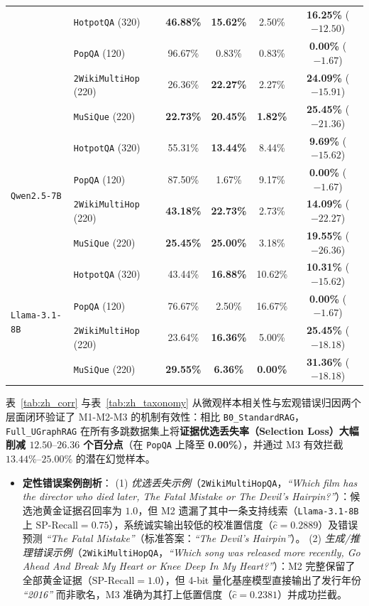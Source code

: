 \documentclass[11pt]{article}
\begin{document}
\begin{table}[t]
{\begin{tabular}{llcccc}
& \texttt{HotpotQA} (320) & \textbf{46.88\%} & \textbf{15.62\%} & 2.50\% & \textbf{16.25\%} ($-12.50$) \\
& \texttt{PopQA} (120) & 96.67\% & 0.83\% & 0.83\% & \textbf{0.00\%} ($-1.67$) \\
& \texttt{2WikiMultiHop} (220) & 26.36\% & \textbf{22.27\%} & 2.27\% & \textbf{24.09\%} ($-15.91$) \\
& \texttt{MuSiQue} (220) & \textbf{22.73\%} & \textbf{20.45\%} & \textbf{1.82\%} & \textbf{25.45\%} ($-21.36$) \\
\midrule
\multirow{4}{*}{\texttt{Qwen2.5-7B}}
& \texttt{HotpotQA} (320) & 55.31\% & \textbf{13.44\%} & 8.44\% & \textbf{9.69\%} ($-15.62$) \\
& \texttt{PopQA} (120) & 87.50\% & 1.67\% & 9.17\% & \textbf{0.00\%} ($-1.67$) \\
& \texttt{2WikiMultiHop} (220) & \textbf{43.18\%} & \textbf{22.73\%} & 2.73\% & \textbf{14.09\%} ($-22.27$) \\
& \texttt{MuSiQue} (220) & \textbf{25.45\%} & \textbf{25.00\%} & 3.18\% & \textbf{19.55\%} ($-26.36$) \\
\midrule
\multirow{4}{*}{\texttt{Llama-3.1-8B}}
& \texttt{HotpotQA} (320) & 43.44\% & \textbf{16.88\%} & 10.62\% & \textbf{10.31\%} ($-15.62$) \\
& \texttt{PopQA} (120) & 76.67\% & 2.50\% & 16.67\% & \textbf{0.00\%} ($-1.67$) \\
& \texttt{2WikiMultiHop} (220) & 23.64\% & \textbf{16.36\%} & 5.00\% & \textbf{25.45\%} ($-18.18$) \\
& \texttt{MuSiQue} (220) & \textbf{29.55\%} & \textbf{6.36\%} & \textbf{0.00\%} & \textbf{31.36\%} ($-18.18$) \\
\bottomrule
\end{tabular}
}
\end{table}

表~\ref{tab:zh_corr} 与表~\ref{tab:zh_taxonomy} 从微观样本相关性与宏观错误归因两个层面闭环验证了 M1-M2-M3 的机制有效性：相比 \texttt{B0\_StandardRAG}，\texttt{Full\_UGraphRAG} 在所有多跳数据集上将\textbf{证据优选丢失率（Selection Loss）大幅削减 $12.50\text{--}26.36$ 个百分点}（在 \texttt{PopQA} 上降至 \textbf{0.00\%}），并通过 M3 有效拦截 $13.44\%\text{--}25.00\%$ 的潜在幻觉样本。

\begin{itemize}[leftmargin=*,nosep]
    \item \textbf{定性错误案例剖析}：
    (1) \emph{优选丢失示例}（\texttt{2WikiMultiHopQA}，\emph{``Which film has the director who died later, The Fatal Mistake or The Devil's Hairpin?''}）：候选池黄金证据召回率为 $1.0$，但 M2 遗漏了其中一条支持线索（\texttt{Llama-3.1-8B} 上 $\text{SP-Recall}=0.75$），系统诚实输出较低的校准置信度（$\hat{c}=0.2889$）及错误预测 \emph{``The Fatal Mistake''}（标准答案：\emph{``The Devil's Hairpin''}）。
    (2) \emph{生成/推理错误示例}（\texttt{2WikiMultiHopQA}，\emph{``Which song was released more recently, Go Ahead And Break My Heart or Knee Deep In My Heart?''}）：M2 完整保留了全部黄金证据（$\text{SP-Recall}=1.0$），但 4-bit 量化基座模型直接输出了发行年份 \emph{``2016''} 而非歌名，M3 准确为其打上低置信度（$\hat{c}=0.2381$）并成功拦截。
\end{itemize}
\end{document}
